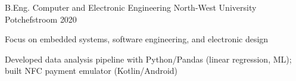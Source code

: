 \begin{cventries}

  \cventry
  {B.Eng. Computer and Electronic Engineering}
  {North-West University}
  {Potchefstroom}
  {2020}
  {
    \begin{cvitems}
      \item Focus on embedded systems, software engineering, and electronic design
      \item Developed data analysis pipeline with Python/Pandas (linear regression, ML); built NFC payment emulator (Kotlin/Android)
    \end{cvitems}
  }

\end{cventries}
